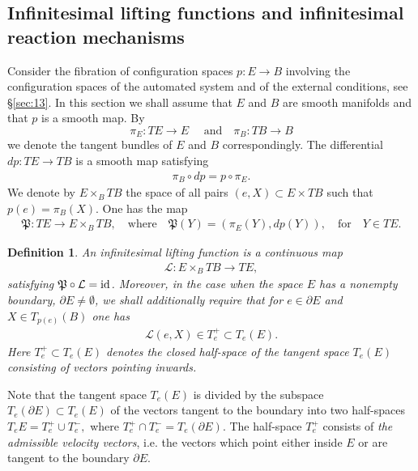 \documentclass[11pt]{amsart}
\newtheorem{definition}[theorem]{Definition}
\begin{document}
{\subsection{Infinitesimal lifting functions and infinitesimal reaction mechanisms}\label{sec:irm} Consider the fibration of configuration spaces $p: E\to B$ involving the configuration spaces of the automated system and of the external conditions, see \S\ref{sec:13}. In this section we  shall assume that $E$ and $B$ are smooth manifolds and that $p$ is a smooth map. By 
$$\pi_E: TE\to E\quad\mbox{ and}\quad  \pi_B: TB\to B$$ we denote the tangent bundles of $E$ and $B$ correspondingly. The differential $dp: TE\to TB$ is a smooth map satisfying 
\begin{eqnarray}
 \pi_B \circ dp = p\circ \pi_E. 
\end{eqnarray}
We denote by $E\times_B TB$ the space of all pairs $(e, X)\subset E\times TB$ such that 
$p(e) =\pi_B( X)$. One has the map
\begin{eqnarray}\label{eq:frakp}
\mathfrak P: TE\to E\times_B TB, \quad \mbox{where}\quad \mathfrak P(Y)= (\pi_E(Y), dp(Y)), \quad \mbox{for}\quad Y\in TE. 
\end{eqnarray}

\begin{definition}\label{def:ilf}
An infinitesimal lifting function is a continuous map
\begin{eqnarray}\label{irm}
\mathcal L: E\times_B TB\to TE,
\end{eqnarray} 
satisfying $\mathfrak P\circ \mathcal L ={\rm id}$. Moreover, 
in the case when the space $E$ has a nonempty boundary, $\partial E\not=\emptyset$, we shall additionally require that for $e\in \partial E$ 
and 
$X\in T_{p(e)}(B)$ one has 
\begin{eqnarray}\label{eq:21d}
\mathcal L(e, X)\in T^{+}_e\subset T_e(E).
\end{eqnarray}
Here $T^{+}_e\subset T_e(E)$ denotes the closed half-space of the tangent space $T_e(E)$ consisting of vectors pointing inwards. 
\end{definition}
Note that the tangent space $T_e(E)$ is divided by the subspace $T_e(\partial E)\subset T_e(E)$ of the vectors tangent to the boundary into two half-spaces
$
T_eE = T_e^+\cup T_e^-, $
where $T_e^+ \cap T_e^- =T_e(\partial E).$
The half-space $T_e^+$ consists of {\it the admissible velocity vectors}, i.e. the vectors which point either inside $E$ or are tangent to the boundary $\partial E$. 



}
\end{document}
